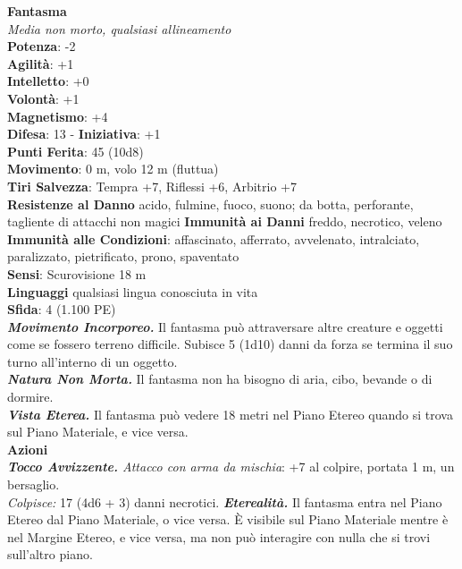 \begin{multicols}{2}
\medskip\textbf{Fantasma}\\
\emph{Media non morto, qualsiasi allineamento}\\
\textbf{Potenza}: -2\\
\textbf{Agilità}: +1\\
\textbf{Intelletto}: +0\\
\textbf{Volontà}: +1\\
\textbf{Magnetismo}: +4\\
\textbf{Difesa}: 13 - \textbf{Iniziativa}: +1\\
\textbf{Punti Ferita}: 45 (10d8)\\
\textbf{Movimento}: 0 m, volo 12 m (fluttua)\\
\textbf{Tiri Salvezza}: Tempra +7, Riflessi +6, Arbitrio +7\\
\textbf{Resistenze al Danno} acido, fulmine, fuoco, suono; da botta, perforante, tagliente di attacchi non magici
\textbf{Immunità ai Danni} freddo, necrotico, veleno\\
\textbf{Immunità alle Condizioni}: affascinato, afferrato, avvelenato, intralciato, paralizzato, pietrificato, prono, spaventato \\
\textbf{Sensi}: Scurovisione 18 m\\
\textbf{Linguaggi} qualsiasi lingua conosciuta in vita\\
\textbf{Sfida}: 4 (1.100 PE)\smallskip\\
\emph{\textbf{Movimento Incorporeo.}} Il fantasma può attraversare altre creature e oggetti come se fossero terreno difficile. Subisce 5 (1d10) danni da forza se termina il suo turno all'interno di un oggetto.\\
\emph{\textbf{Natura Non Morta.}} Il fantasma non ha bisogno di aria, cibo, bevande o di dormire.\\
\emph{\textbf{Vista Eterea.}} Il fantasma può vedere 18 metri nel Piano  Etereo quando si trova sul Piano Materiale, e vice versa.\\
\smallskip\textbf{Azioni}\\
\emph{\textbf{Tocco Avvizzente.} Attacco con arma da mischia}: +7 al colpire, portata 1 m, un bersaglio.\\
\emph{Colpisce:} 17 (4d6 + 3) danni necrotici. 
\emph{\textbf{Eterealità.}} Il fantasma entra nel Piano Etereo dal Piano Materiale, o vice versa. È visibile sul Piano Materiale mentre è nel Margine Etereo, e vice versa, ma non può interagire con nulla che si trovi sull'altro piano.\\

\end{multicols}
